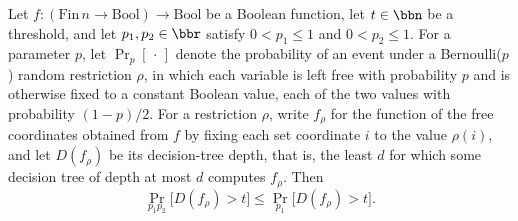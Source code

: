 \begin{theorem}
\label{LMN.bernoulliRestrProb_dtDepth_compose_le}
\leanok
{}
Let $f : (\mathrm{Fin}\,n \to \mathrm{Bool}) \to \mathrm{Bool}$ be a Boolean function,
let $t \in \bbn$ be a threshold, and let $p_1, p_2 \in \bbr$ satisfy $0 < p_1 \le 1$ and
$0 < p_2 \le 1$. For a parameter $p$, let $\Pr_p[\,\cdot\,]$ denote the probability of
an event under a Bernoulli($p$) random restriction $\rho$, in which each variable is
left free with probability $p$ and is otherwise fixed to a constant Boolean value, each
of the two values with probability $(1-p)/2$. For a restriction $\rho$, write $f_\rho$
for the function of the free coordinates obtained from $f$ by fixing each set coordinate
$i$ to the value $\rho(i)$, and let $D(f_\rho)$ be its decision-tree depth, that is, the
least $d$ for which some decision tree of depth at most $d$ computes $f_\rho$. Then
\[
  \Pr_{p_1 p_2}\bigl[D(f_\rho) > t\bigr] \le
  \Pr_{p_1}\bigl[D(f_\rho) > t\bigr].
\]
\end{theorem}
